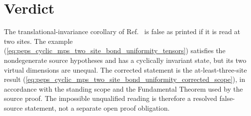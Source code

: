\documentclass{article}
\begin{document}
\section{Verdict}

The translational-invariance corollary of Ref.~\cite{Molnar2018NormalPEPS} is
false as printed if it is read at two sites.  The example
(\ref{eq:peps_cyclic_mps_two_site_bond_uniformity_tensors}) satisfies the
nondegenerate source hypotheses and has a cyclically invariant state, but its
two virtual dimensions are unequal.  The corrected statement is the
at-least-three-site result
(\ref{eq:peps_cyclic_mps_two_site_bond_uniformity_corrected_scope}), in
accordance with the standing scope and the Fundamental Theorem used by the
source proof.  The impossible unqualified reading is therefore a resolved
false-source statement, not a separate open proof obligation.



\end{document}
